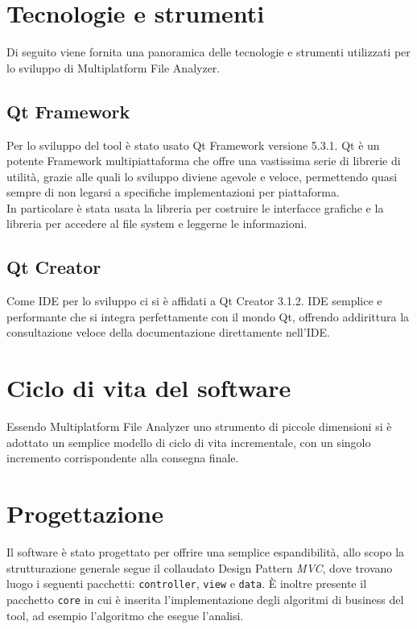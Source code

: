 \section{Tecnologie e strumenti}
	Di seguito viene fornita una panoramica delle tecnologie e strumenti utilizzati per lo sviluppo di Multiplatform File Analyzer.
	
	\subsection{Qt Framework}
		Per lo sviluppo del tool è stato usato Qt Framework versione 5.3.1. Qt è un potente Framework multipiattaforma che offre una vastissima serie di librerie di utilità, grazie alle quali lo sviluppo diviene agevole e veloce, permettendo quasi  sempre di non legarsi a specifiche implementazioni per piattaforma.\\
		In particolare è stata usata la libreria per costruire le interfacce grafiche e la libreria per accedere al file system e leggerne le informazioni.
		
	\subsection{Qt Creator}
		Come IDE per lo sviluppo ci si è affidati a Qt Creator 3.1.2. IDE semplice e performante che si integra perfettamente con il mondo Qt, offrendo addirittura la consultazione veloce della documentazione direttamente nell'IDE.
		
\section{Ciclo di vita del software}
	Essendo Multiplatform File Analyzer uno strumento di piccole dimensioni si è adottato un semplice modello di ciclo di vita incrementale, con un singolo incremento corrispondente alla consegna finale.
	
\section{Progettazione}
	Il software è stato progettato per offrire una semplice espandibilità, allo scopo la strutturazione generale segue il collaudato Design Pattern \textit{MVC}, dove trovano luogo i seguenti pacchetti: \texttt{controller}, \texttt{view} e \texttt{data}. È inoltre presente il pacchetto \texttt{core} in cui è inserita l'implementazione degli algoritmi di business del tool, ad esempio l'algoritmo che esegue l'analisi.\\
	
